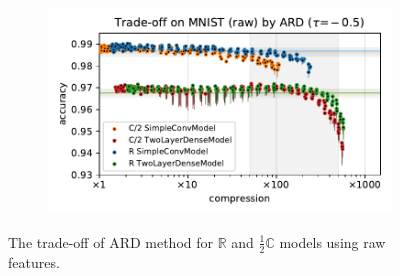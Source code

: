 \documentclass[a4paper,10pt,twocolumn]{article}
\newcommand{\real}{\mathbb{R}}
\newcommand{\cplx}{\mathbb{C}}
\begin{document}
\begin{figure}[b]
\begin{subfigure}[b]{0.5\columnwidth}
  \end{subfigure}%
  \begin{subfigure}[b]{0.5\columnwidth}
    \centering
    \includegraphics[width=\linewidth]{figure__mnist-like__trade-off/appendix__cmp__ARD__mnist__raw__-0.5.pdf}
  \end{subfigure}
  \caption{%
    The trade-off of ARD method for $\real$ and $\tfrac12\cplx$ models using raw features.
  }
  \label{fig:appendix__cmp__mnist-like__trade-off__ARD__raw}
\end{figure}
\end{document}
